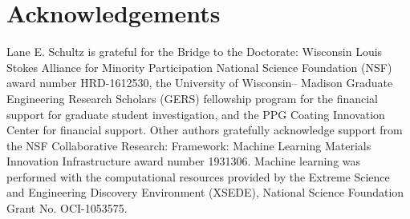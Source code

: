 \section{Acknowledgements}

\par
Lane E. Schultz is grateful for the Bridge to the Doctorate: Wisconsin Louis Stokes Alliance for Minority Participation National Science Foundation (NSF) award number HRD-1612530, the University of Wisconsin– Madison Graduate Engineering Research Scholars (GERS) fellowship program for the financial support for graduate student investigation, and the PPG Coating Innovation Center for financial support. Other authors gratefully acknowledge support from the NSF Collaborative Research: Framework: Machine Learning Materials Innovation Infrastructure award number 1931306. Machine learning was performed with the computational resources provided by the Extreme Science and Engineering Discovery Environment (XSEDE), National Science Foundation Grant No. OCI-1053575.